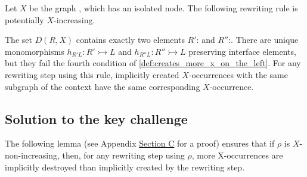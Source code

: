 \begin{example}
    \label{ex:cond4_necessaire}
    Let $X$ be the graph 
    , which has an isolated node. The following rewriting rule is potentially $X$-increasing.
    \begin{center}
    \end{center}
    The set \( D(R,X) \) contains exactly two elements $R'$:
     and $R''$:. 
    There are unique monomorphisms $h_{R'L}:R' \rightarrowtail L$ and $h_{R''L}:R'' \rightarrowtail L$ preserving interface elements, but they fail the fourth condition of \autoref{def:creates_more_x_on_the_left}.
    For any rewriting step using this rule, implicitly created $X$-occurrences with the same subgraph of the context have the same corresponding $X$-occurrence.
\end{example}


\subsection{Solution to the key challenge}
\label{sec:solution_to_the_key_challenge}
The following lemma (see \iflongversion
Appendix \hyperref[proof:lem:w_u_l_not_geq_r_not]{Section C}
\else
\cite[Lemma 40]{qiu2025termination}
\fi for a proof) ensures that if $\rho$ is $X$-non-increasing, then, for any rewriting step using $\rho$, 
more X-occurrences are implicitly destroyed than implicitly created by the rewriting step.


